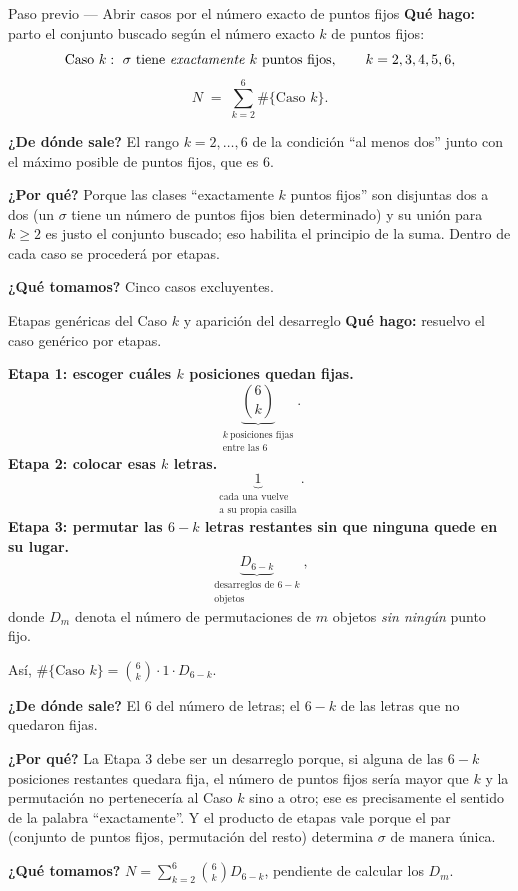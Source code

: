 \documentclass[11pt]{article}
\begin{document}
\begin{paso}{Paso previo --- Abrir casos por el n\'umero exacto de puntos fijos}
\textbf{Qu\'e hago:} parto el conjunto buscado seg\'un el n\'umero exacto $k$ de puntos fijos:
\[
\text{Caso } k:\ \sigma \text{ tiene \emph{exactamente} } k \text{ puntos fijos},\qquad k=2,3,4,5,6 ,
\]
\[
N\;=\;\sum_{k=2}^{6}\#\{\text{Caso } k\} .
\]

\textbf{¿De d\'onde sale?} El rango $k=2,\dots,6$ de la condici\'on ``al menos dos'' junto con el m\'aximo
posible de puntos fijos, que es $6$.

\textbf{¿Por qu\'e?} Porque las clases ``exactamente $k$ puntos fijos'' son disjuntas dos a dos (un $\sigma$
tiene un n\'umero de puntos fijos bien determinado) y su uni\'on para $k\ge 2$ es justo el conjunto buscado;
eso habilita el principio de la suma. Dentro de cada caso se proceder\'a por etapas.

\textbf{¿Qu\'e tomamos?} Cinco casos excluyentes.
\end{paso}

\begin{paso}{Etapas gen\'ericas del Caso $k$ y aparici\'on del desarreglo}
\textbf{Qu\'e hago:} resuelvo el caso gen\'erico por etapas.

\medskip
\textbf{Etapa 1: escoger cu\'ales $k$ posiciones quedan fijas.}
\[
\underbrace{\binom{6}{k}}_{\substack{k\ \text{posiciones fijas}\\ \text{entre las 6}}} .
\]
\textbf{Etapa 2: colocar esas $k$ letras.}
\[
\underbrace{1}_{\substack{\text{cada una vuelve}\\ \text{a su propia casilla}}} .
\]
\textbf{Etapa 3: permutar las $6-k$ letras restantes sin que ninguna quede en su lugar.}
\[
\underbrace{D_{6-k}}_{\substack{\text{desarreglos de }6-k\\ \text{objetos}}} ,
\]
donde $D_m$ denota el n\'umero de permutaciones de $m$ objetos \emph{sin ning\'un} punto fijo.

\medskip
As\'i, $\#\{\text{Caso } k\}=\binom{6}{k}\cdot 1\cdot D_{6-k}$.

\textbf{¿De d\'onde sale?} El $6$ del n\'umero de letras; el $6-k$ de las letras que no quedaron fijas.

\textbf{¿Por qu\'e?} La Etapa 3 debe ser un desarreglo porque, si alguna de las $6-k$ posiciones restantes
quedara fija, el n\'umero de puntos fijos ser\'ia mayor que $k$ y la permutaci\'on no pertenecer\'ia al
Caso $k$ sino a otro; ese es precisamente el sentido de la palabra ``exactamente''. Y el producto de etapas
vale porque el par (conjunto de puntos fijos, permutaci\'on del resto) determina $\sigma$ de manera \'unica.

\textbf{¿Qu\'e tomamos?} $N=\displaystyle\sum_{k=2}^{6}\binom{6}{k}D_{6-k}$, pendiente de calcular los $D_m$.
\end{paso}
\end{document}
